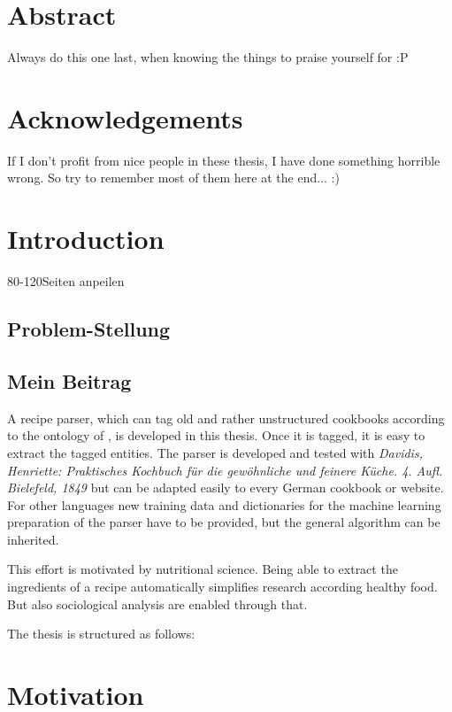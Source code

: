 \documentclass[12pt, twoside]{report}
\begin{document}
\chapter*{Abstract}
Always do this one last, when knowing the things to praise  yourself for :P

\chapter*{Acknowledgements}
If I don't profit from nice people in these thesis, I have done something horrible wrong. So try to remember most of them here at the end... :)

\tableofcontents

\listoffigures
\begingroup
	\let\clearpage\relax
	\listoftables
\endgroup

\clearpage
{}  
\chapter{Introduction}
80-120Seiten anpeilen
\section{Problem-Stellung}
\section{Mein Beitrag}

A recipe parser, which can tag old and rather unstructured cookbooks according to the ontology of \parencite{schemaOrg}, is developed in this thesis. Once it is tagged, it is easy to extract the tagged entities. The parser is developed and tested with \textit{Davidis, Henriette: Praktisches Kochbuch für die gewöhnliche und feinere Küche. 4. Aufl. Bielefeld, 1849} but can be adapted easily to every German cookbook or website. For other languages new training data and dictionaries for the machine learning preparation of the parser have to be provided, but the general algorithm can be inherited.

This effort is motivated by nutritional science. Being able to extract the ingredients of a recipe automatically simplifies research according healthy food. But also sociological analysis are enabled through that.

The thesis is structured as follows:

\chapter{Motivation}
\end{document}
